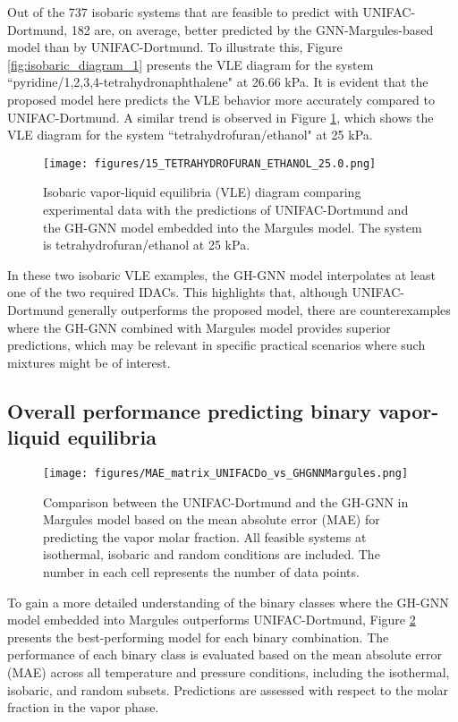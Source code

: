 Out of the 737 isobaric systems that are feasible to predict with UNIFAC-Dortmund, 182 are, on average, better predicted by the GNN-Margules-based model than by UNIFAC-Dortmund. To illustrate this, Figure \ref{fig:isobaric_diagram_1} presents the VLE diagram for the system ``pyridine/1,2,3,4-tetrahydronaphthalene" at 26.66 kPa. It is evident that the proposed model here predicts the VLE behavior more accurately compared to UNIFAC-Dortmund. A similar trend is observed in Figure \ref{fig:isobaric_diagram_2}, which shows the VLE diagram for the system “tetrahydrofuran/ethanol" at 25 kPa.

\begin{figure}[h]
    \centering
    \texttt{[image: figures/15\_TETRAHYDROFURAN\_ETHANOL\_25.0.png]}
    \caption{Isobaric vapor-liquid equilibria (VLE) diagram comparing experimental data with the predictions of UNIFAC-Dortmund and the GH-GNN model embedded into the Margules model. The system is tetrahydrofuran/ethanol at 25 kPa.}
    \label{fig:isobaric_diagram_2}
\end{figure}

In these two isobaric VLE examples, the GH-GNN model interpolates at least one of the two required IDACs. This highlights that, although UNIFAC-Dortmund generally outperforms the proposed model, there are counterexamples where the GH-GNN combined with Margules model provides superior predictions, which may be relevant in specific practical scenarios where such mixtures might be of interest.

\subsection{Overall performance predicting binary vapor-liquid equilibria}

\begin{figure}[h!]
    \centering
    \texttt{[image: figures/MAE\_matrix\_UNIFACDo\_vs\_GHGNNMargules.png]}
    \caption{Comparison between the UNIFAC-Dortmund and the GH-GNN in Margules model based on the mean absolute error (MAE) for predicting the vapor molar fraction. All feasible systems at isothermal, isobaric and random conditions are included. The number in each cell represents the number of data points.}
    \label{fig:mae_matrix_ghgnn_vs_unifac}
\end{figure}

To gain a more detailed understanding of the binary classes where the GH-GNN model embedded into Margules outperforms UNIFAC-Dortmund, Figure \ref{fig:mae_matrix_ghgnn_vs_unifac} presents the best-performing model for each binary combination. The performance of each binary class is evaluated based on the mean absolute error (MAE) across all temperature and pressure conditions, including the isothermal, isobaric, and random subsets. Predictions are assessed with respect to the molar fraction in the vapor phase.



